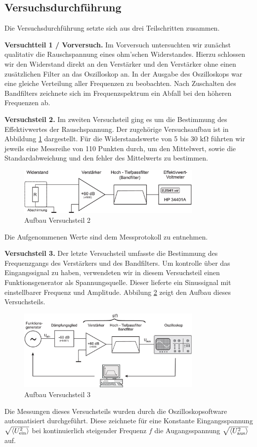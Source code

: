 \newpage\noindent
\subsection{Versuchsdurchführung}

Die Versuchsdurchführung setzte sich aus drei Teilschritten zusammen. 

\textbf{Versuchtteil 1 / Vorversuch.} Im Vorversuch untersuchten wir zunächst qualitativ die Rauschspannung eines ohm'schen Widerstandes. Hierzu schlossen wir den Widerstand direkt an den Verstärker und den Verstärker ohne einen zusätzlichen Filter an das Oszilloskop an. In der Ausgabe des Oszilloskops war eine gleiche Verteilung aller Frequenzen zu beobachten. Nach Zuschalten des Bandfilters zeichnete sich im Frequenzspektrum ein Abfall bei den höheren Frequenzen ab.

\textbf{Versuchsteil 2.} Im zweiten Versuchsteil ging es um die Bestimmung des Effektivwertes der Rauschspannung. Der zugehörige Versuchsaufbau ist in Abbildung \ref{fig:aufbau_vt2} dargestellt. Für die Widerstandswerte von 5 bis 30 $\si{\kilo\ohm}$ führten wir jeweils eine Messreihe von 110 Punkten durch, um den Mittelwert, sowie die Standardabweichung und den fehler des Mittelwerts zu bestimmen.

\begin{figure}[H]
  \centering
  \includegraphics[width=0.8\textwidth]{files/schaltplan_aufgabe2.png}
  \caption{Aufbau Versuchsteil 2}
  \label{fig:aufbau_vt2}
\end{figure}

Die Aufgenommenen Werte sind dem Messprotokoll zu entnehmen.

\textbf{Versuchsteil 3.} Der letzte Versuchsteil umfasste die Bestimmung des Frequenzgangs des Verstärkers und des Bandfilters. Um kontrolle über das Eingangssignal zu haben, verwendeten wir in diesem Versuchsteil einen Funktionsgenerator als Spannungsquelle. Dieser lieferte ein Sinussignal mit einstellbarer Frequenz und Amplitude. Abbilung \ref{fig:aufbau_vt3} zeigt den Aufbau dieses Versuchsteils.

\begin{figure}[H]
  \centering
  \includegraphics[width=0.8\textwidth]{files/schaltplan_aufgabe3.png}
  \caption{Aufbau Versuchsteil 3}
  \label{fig:aufbau_vt3}
\end{figure}

Die Messungen dieses Versuchsteils wurden durch die Oszilloskopsoftware automatisiert durchgeführt. Diese zeichnete für eine Konstante Eingangsspannung $\sqrt{\langle U^2_\text{ein} \rangle}$ bei kontinuierlich steigender Frequenz $f$ die Augangsspannung $\sqrt{\langle U^2_\text{aus} \rangle}$ auf.